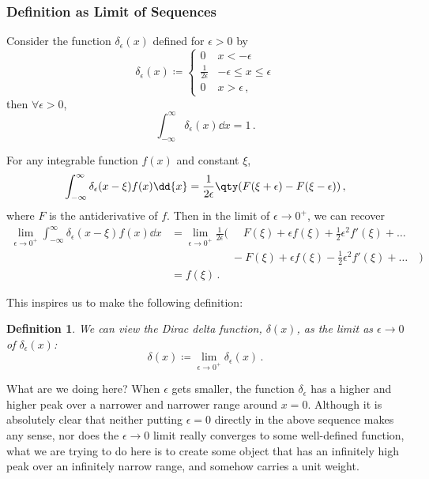 \documentclass{article}
\theoremstyle{plain}\theoremheaderfont{\normalfont\itshape}\theorembodyfont{\rmfamily}\theoremseparator{.}\newtheorem*{rem}{Remark}\newtheorem*{ex}{Example}\newtheorem*{proof}{Proof}\newtheorem*{altp}{Alternative proof}
\theoremstyle{plain}\theoremheaderfont{\normalfont\bfseries}\theorembodyfont{\rmfamily}\theoremseparator{.}\newtheorem{thm}{Theorem}[section]\newtheorem{lem}[thm]{Lemma}\newtheorem{prop}[thm]{Proposition}\newtheorem*{cor}{Corollary}\newtheorem{defn}[thm]{Definition}\newtheorem{clm}[thm]{Claim}\newtheorem{clminproof}{Claim}
\theoremstyle{break}\theoremheaderfont{\normalfont\itshape}\theorembodyfont{\rmfamily}\theoremseparator{.\medskip}\newtheorem*{proofskip}{Proof}\newtheorem*{exs}{Examples}\newtheorem*{rems}{Remarks}
\theoremstyle{break}\theoremheaderfont{\normalfont\bfseries}\theorembodyfont{\rmfamily}\theoremseparator{.\medskip}\newtheorem{lemskip}[thm]{Lemma}\newtheorem{defnskip}[thm]{Definition}\newtheorem{propskip}[thm]{Proposition}\newtheorem{thmskip}[thm]{Theorem}
\numberwithin{equation}{section}
\begin{document}
	\subsubsection{Definition as Limit of Sequences}
	Consider the function \(\delta_\epsilon(x)\) defined for \(\epsilon>0\) by
	\[\delta_\epsilon(x)\coloneqq\begin{cases}
		0 & x<-\epsilon\\
		\frac{1}{2\epsilon} & -\epsilon\le x\le \epsilon\\
		0 & x>\epsilon\,,
	\end{cases}\]
	then \(\forall\epsilon>0\),
	\[\int_{-\infty}^{\infty}\delta_\epsilon(x)\dd{x}=1\,.\]
	
	For any integrable function \(f(x)\) and constant \(\xi\),
	\[\int_{-\infty}^{\infty}\delta_\epsilon(x-\xi)f(x)\dd{x}=\frac{1}{2\epsilon}\qty(F(\xi+\epsilon)-F(\xi-\epsilon))\,,\]
	where \(F\) is the antiderivative of \(f\). Then in the limit of \(\epsilon\to 0^+\), we can recover
	\begin{align*}
		\lim_{\epsilon\to 0^+}\int_{-\infty}^{\infty}\delta_\epsilon(x-\xi)f(x)\dd{x}&=\lim_{\epsilon\to 0^+}\frac{1}{2\epsilon}\Big(\,\,\quad F(\xi)+\epsilon f(\xi)+\frac{1}{2}\epsilon^2 f'(\xi)+\dots\;&\\
		&\qquad\quad\qquad\,\,\,-F(\xi)+\epsilon f(\xi)-\frac{1}{2}\epsilon^2f'(\xi)+\dots\quad\Big)\\
		&=f(\xi)\,.
	\end{align*}
	
	This inspires us to make the following definition:
	\begin{defn}
		We can view the \textit{Dirac delta function}, \(\delta(x)\), as the limit as \(\epsilon\to 0\) of \(\delta_\epsilon(x)\):
		\[\delta(x)\coloneqq\lim_{\epsilon\to 0^+}\delta_{\epsilon}(x)\,.\]
	\end{defn}
	What are we doing here? When \(\epsilon\) gets smaller, the function \(\delta_\epsilon\) has a higher and higher peak over a narrower and narrower range around \(x=0\). Although it is absolutely clear that neither putting \(\epsilon=0\) directly in the above sequence makes any sense, nor does the \(\epsilon\to 0\) limit really converges to some well-defined function, what we are trying to do here is to create some object that has an infinitely high peak over an infinitely narrow range, and somehow carries a unit weight.
	
\end{document}
